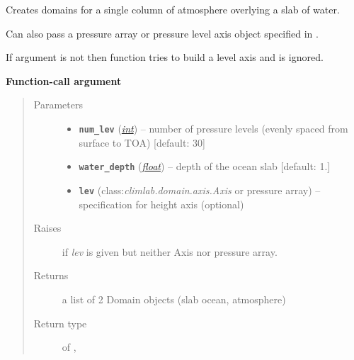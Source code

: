 \documentclass[letterpaper,10pt,english]{sphinxmanual}
\begin{document}

\begin{fulllineitems}
\label{api/climlab.domain:climlab.domain.domain.single_column}
Creates domains for a single column of atmosphere overlying a slab of water.

Can also pass a pressure array or pressure level axis object specified in .

If argument  is not  then function tries to build a level axis
and  is ignored.

\textbf{Function-call argument}
\begin{quote}\begin{description}
\item[{Parameters}] \leavevmode\begin{itemize}
\item {} 
\textbf{\texttt{num\_lev}} (\href{http://docs.python.org/2.7/library/functions.html\#int}{\emph{int}}) -- number of pressure levels
(evenly spaced from surface to TOA) {[}default: 30{]}

\item {} 
\textbf{\texttt{water\_depth}} (\href{http://docs.python.org/2.7/library/functions.html\#float}{\emph{float}}) -- depth of the ocean slab {[}default: 1.{]}

\item {} 
\textbf{\texttt{lev}} (class:\emph{climlab.domain.axis.Axis} or pressure array) -- specification for height axis (optional)

\end{itemize}

\item[{Raises}] \leavevmode
{}  if \emph{lev} is given but neither Axis 
nor pressure array.

\item[{Returns}] \leavevmode
a list of 2 Domain objects (slab ocean, atmosphere)

\item[{Return type}] \leavevmode
\href{http://docs.python.org/2.7/library/functions.html\#list}{} of {\hyperref[api/climlab.domain:climlab.domain.domain.SlabOcean]{\emph{}}}, {\hyperref[api/climlab.domain:climlab.domain.domain.SlabAtmosphere]{\emph{}}}


\end{description}
\end{quote}
\end{fulllineitems}
\end{document}
